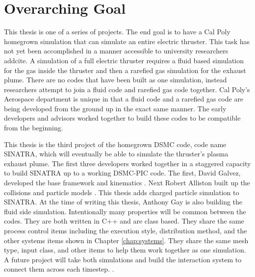 


\section{Overarching Goal}
This thesis is one of a series of projects. The end goal is to have a Cal Poly homegrown simulation that can simulate an entire electric thruster. This task has not yet been accomplished in a manner accessible to university researchers addcite{}. A simulation of a full electric thruster requires a fluid based simulation for the gas inside the thruster and then a rarefied gas simulation for the exhaust plume. There are no codes that have been built as one simulation, instead researchers attempt to join a fluid code and rarefied gas code together. Cal Poly’s Aerospace department is unique in that a fluid code and a rarefied gas code are being developed from the ground up in the exact same manner. The early developers and advisors worked together to build these codes to be compatible from the beginning. \par

\indent This thesis is the third project of the homegrown DSMC code, code name SINATRA, which will eventually be able to simulate the thruster’s plasma exhaust plume. The first three developers worked together in a staggered capacity to build SINATRA up to a working DSMC-PIC code. The first, David Galvez, developed the base framework and kinematics \cite{Galvez2018a}. Next Robert Alliston built up the collisions and particle models \cite{mac_thesis}. This thesis adds charged particle simulation to SINATRA. At the time of writing this thesis, Anthony Gay is also building the fluid side simulation. Intentionally many properties will be common between the codes. They are both written in C++ and are class based. They share the same process control items including the execution style, distribution method, and the other systems items shown in Chapter \ref{chap:systems}. They share the same mesh type, input class, and other items to help them work together as one simulation. A future project will take both simulations and build the interaction system to connect them across each timestep.
. 
